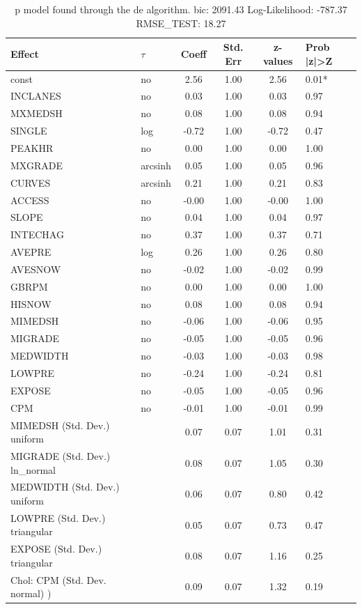 \begin{table}
	\caption{p model found through the de algorithm. bic: 2091.43 Log-Likelihood: -787.37 RMSE_TEST: 18.27}
	\begin{center}
		\begin{tabular}{|l|l|c|c|c|l|}
			\hline
			Effect & $\tau$ & Coeff & Std. Err & z-values & Prob |z|>Z \\
			\hline
			const & no & 2.56 & 1.00 & 2.56 & 0.01* \\
			\hline
			INCLANES & no & 0.03 & 1.00 & 0.03 & 0.97 \\
			\hline
			MXMEDSH & no & 0.08 & 1.00 & 0.08 & 0.94 \\
			\hline
			SINGLE & log & -0.72 & 1.00 & -0.72 & 0.47 \\
			\hline
			PEAKHR & no & 0.00 & 1.00 & 0.00 & 1.00 \\
			\hline
			MXGRADE & arcsinh & 0.05 & 1.00 & 0.05 & 0.96 \\
			\hline
			CURVES & arcsinh & 0.21 & 1.00 & 0.21 & 0.83 \\
			\hline
			ACCESS & no & -0.00 & 1.00 & -0.00 & 1.00 \\
			\hline
			SLOPE & no & 0.04 & 1.00 & 0.04 & 0.97 \\
			\hline
			INTECHAG & no & 0.37 & 1.00 & 0.37 & 0.71 \\
			\hline
			AVEPRE & log & 0.26 & 1.00 & 0.26 & 0.80 \\
			\hline
			AVESNOW & no & -0.02 & 1.00 & -0.02 & 0.99 \\
			\hline
			GBRPM & no & 0.00 & 1.00 & 0.00 & 1.00 \\
			\hline
			HISNOW & no & 0.08 & 1.00 & 0.08 & 0.94 \\
			\hline
			MIMEDSH & no & -0.06 & 1.00 & -0.06 & 0.95 \\
			\hline
			MIGRADE & no & -0.05 & 1.00 & -0.05 & 0.96 \\
			\hline
			MEDWIDTH & no & -0.03 & 1.00 & -0.03 & 0.98 \\
			\hline
			LOWPRE & no & -0.24 & 1.00 & -0.24 & 0.81 \\
			\hline
			EXPOSE & no & -0.05 & 1.00 & -0.05 & 0.96 \\
			\hline
			CPM & no & -0.01 & 1.00 & -0.01 & 0.99 \\
			\hline
			MIMEDSH (Std. Dev.) uniform &  & 0.07 & 0.07 & 1.01 & 0.31 \\
			\hline
			MIGRADE (Std. Dev.) ln_normal &  & 0.08 & 0.07 & 1.05 & 0.30 \\
			\hline
			MEDWIDTH (Std. Dev.) uniform &  & 0.06 & 0.07 & 0.80 & 0.42 \\
			\hline
			LOWPRE (Std. Dev.) triangular &  & 0.05 & 0.07 & 0.73 & 0.47 \\
			\hline
			EXPOSE (Std. Dev.) triangular &  & 0.08 & 0.07 & 1.16 & 0.25 \\
			\hline
			 Chol: CPM (Std. Dev. normal) ) &  & 0.09 & 0.07 & 1.32 & 0.19 \\
			\hline
		\end{tabular}
	\end{center}
\end{table}